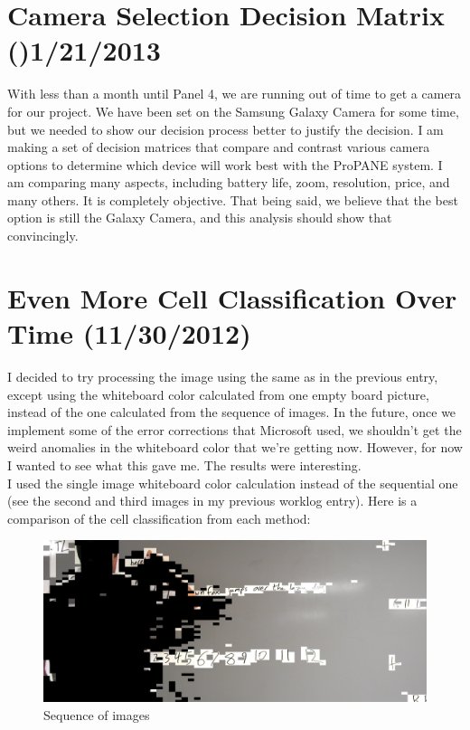 \documentclass[]{article}
\begin{document}
	\section{Camera Selection Decision Matrix ()1/21/2013}
		With less than a month until Panel 4, we are running out of time to get a camera for our project.  We have been set on the Samsung Galaxy Camera for some time, but we needed to show our decision process better to justify the decision.  I am making a set of decision matrices that compare and contrast various camera options to determine which device will work best with the ProPANE system.  I am comparing many aspects, including battery life, zoom, resolution, price, and many others.  It is completely objective.  That being said, we believe that the best option is still the Galaxy Camera, and this analysis should show that convincingly.
	
	\section{Even More Cell Classification Over Time (11/30/2012)}
		I decided to try processing the image using the same as in the previous entry, except using the whiteboard color calculated from one empty board picture, instead of the one calculated from the sequence of images.  In the future, once we implement some of the error corrections that Microsoft used, we shouldn't get the weird anomalies in the whiteboard color that we're getting now.  However, for now I wanted to see what this gave me.  The results were interesting.  \\
		 	
		 	I used the single image whiteboard color calculation instead of the sequential one (see the second and third images in my previous worklog entry).  Here is a comparison of the cell classification from each method:
		 	
\begin{figure}[H]
\centering
\includegraphics[scale=0.25]{images/griffin_foreground1}
\caption{Sequence of images}
\end{figure}
		
\end{document}
